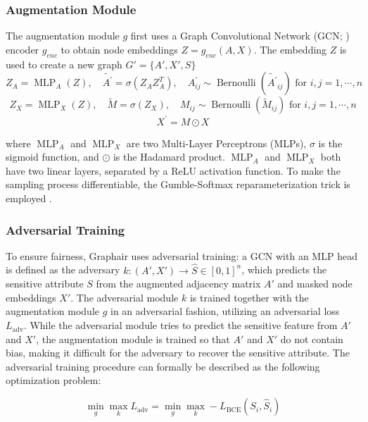 \subsubsection{Augmentation Module}

The augmentation module $g$ first uses a Graph Convolutional Network (GCN; \citealp{kipf2017semisupervised}) encoder $g_{enc}$ to obtain node embeddings $Z = g_{enc}(A, X)$. 
The embedding $Z$ is used to create a new graph $G' = \{A', X', S\}$
$$
Z_A = \operatorname{MLP}_A(Z), \quad \widetilde{A^{\prime}} = \sigma\left(Z_A Z_A^T\right),
\quad A_{i j}^{\prime} \sim \operatorname{Bernoulli}\left(\widetilde{A^{\prime}}{ }_{i j}\right) \text { for } i, j=1, \cdots, n
$$
$$
Z_X = \operatorname{MLP}_X(Z), \quad
\widetilde{M} = \sigma\left(Z_X\right), \quad
M_{i j} \sim \operatorname{Bernoulli}\left(\widetilde{M}_{i j}\right) \text { for } i, j=1, \cdots, n
$$
$$X^{\prime}=M \odot X
$$

where $\operatorname{MLP}_A$ and $\operatorname{MLP}_X$ are two Multi-Layer Perceptrons (MLPs), $\sigma$ is the sigmoid function, and $\odot$ is the Hadamard product.
$\operatorname{MLP}_A$ and $\operatorname{MLP}_X$ both have two linear layers, separated by a ReLU activation function.
To make the sampling process differentiable, the Gumble-Softmax reparameterization trick is employed \citep{jang-reparameterization}.


\subsubsection{Adversarial Training}

To ensure fairness, Graphair uses adversarial training: a GCN with an MLP head is defined as the adversary $k: (A', X') \xrightarrow{} \hat{S} \in [0, 1]^n$, which predicts the sensitive attribute $S$ from the augmented adjacency matrix $A'$ and masked node embeddings $X'$.
The adversarial module $k$ is trained together with the augmentation module $g$ in an adversarial fashion, utilizing an adversarial loss $L_{\mathrm{adv}}$. 
While the adversarial module tries to predict the sensitive feature from $A'$ and $X'$, the augmentation module is trained so that $A'$ and $X'$ do not contain bias, making it difficult for the adversary to recover the sensitive attribute.
The adversarial training procedure can formally be described as the following optimization problem:

$$\min _g \max _k L_{\mathrm{adv}} = \min _g \max _k -L_{\text{BCE}}\left(S_i, \hat{S}_i\right)$$

